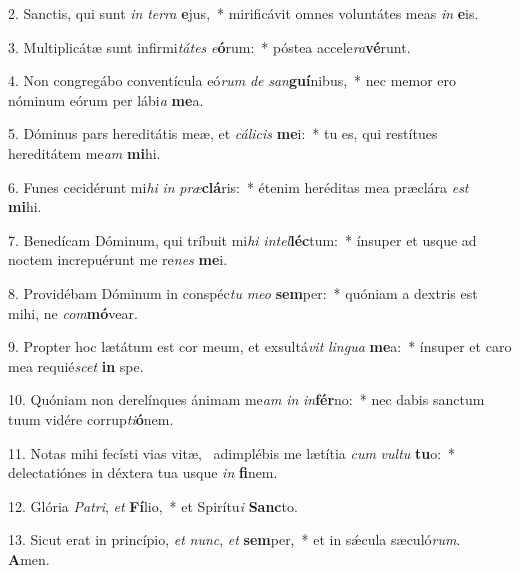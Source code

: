 2. Sanctis, qui sunt \textit{in} \textit{ter}\textit{ra} \textbf{e}jus,~*  mirificávit omnes voluntátes meas \textit{in} \textbf{e}is.\

3. Multiplicátæ sunt infirmi\textit{tá}\textit{tes} \textit{e}\textbf{ó}rum:~*  póstea accele\textit{ra}\textbf{vé}runt.\

4. Non congregábo conventícula eó\textit{rum} \textit{de} \textit{san}\textbf{guí}nibus,~*  nec memor ero nóminum eórum per lábi\textit{a} \textbf{me}a.\

5. Dóminus pars hereditátis meæ, et \textit{cá}\textit{li}\textit{cis} \textbf{me}i:~*  tu es, qui restítues hereditátem me\textit{am} \textbf{mi}hi.\

6. Funes cecidérunt mi\textit{hi} \textit{in} \textit{præ}\textbf{clá}ris:~*  étenim heréditas mea præclára \textit{est} \textbf{mi}hi.\

7. Benedícam Dóminum, qui tríbuit mi\textit{hi} \textit{in}\textit{tel}\textbf{léc}tum:~*  ínsuper et usque ad noctem increpuérunt me re\textit{nes} \textbf{me}i.\

8. Providébam Dóminum in conspéc\textit{tu} \textit{me}\textit{o} \textbf{sem}per:~*  quóniam a dextris est mihi, ne \textit{com}\textbf{mó}vear.\

9. Propter hoc lætátum est cor meum, et exsultá\textit{vit} \textit{lin}\textit{gua} \textbf{me}a:~*  ínsuper et caro mea requié\textit{scet} \textbf{in} spe.\

10. Quóniam non derelínques ánimam me\textit{am} \textit{in} \textit{in}\textbf{fér}no:~*  nec dabis sanctum tuum vidére corrup\textit{ti}\textbf{ó}nem.\

11. Notas mihi fecísti vias vitæ, \dag\  adimplébis me lætítia \textit{cum} \textit{vul}\textit{tu} \textbf{tu}o:~*  delectatiónes in déxtera tua usque \textit{in} \textbf{fi}nem.\

12. Glória \textit{Pa}\textit{tri}, \textit{et} \textbf{Fí}lio,~*  et Spirítu\textit{i} \textbf{Sanc}to.\

13. Sicut erat in princípio, \textit{et} \textit{nunc}, \textit{et} \textbf{sem}per,~*  et in sǽcula sæculó\textit{rum}. \textbf{A}men.\

